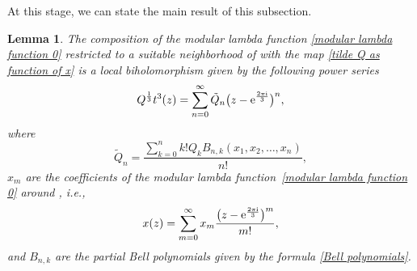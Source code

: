 \documentclass[pdftex]{sigma}
\numberwithin{equation}{section}
\newtheorem{Lemma}[Theorem]{Lemma}
\begin{document}
At this stage, we can state the main result of this subsection.


\begin{Lemma}\label{t3 geometric interpretation}
 The composition of the modular lambda function \eqref{modular lambda function 0} restricted to a suitable neighborhood of  with the map \eqref{tilde Q as function of x} is a local biholomorphism given by the following power series
 \begin{gather}
 Q^{\frac{1}{3}}t^3(z) = \sum_{n=0}^{\infty}\tilde Q_n \bigl(z - {\rm e}^{\frac{2\pi {\rm i}}{3}} \bigr)^n,\label{local biholomorphism tildeQ to z}
 \end{gather}
 where
\[
 \tilde Q_n = \frac{ \sum_{k=0}^{n} k! Q_k B_{n,k} (x_1,x_2,\dots,x_n)}{n!},
 \]
 $x_m$ are the coefficients of the modular lambda function~\eqref{modular lambda function 0} around , i.e.,
 \begin{gather*}
 x(z) = \sum_{m=0}^{\infty} x_m \frac{\bigl( z - {\rm e}^{\frac{2\pi {\rm i}}{3}} \bigr)^m}{m!},
 \end{gather*}
 and $B_{n,k}$ are the partial Bell polynomials given by the formula \eqref{Bell polynomials}.
\end{Lemma}
\end{document}

